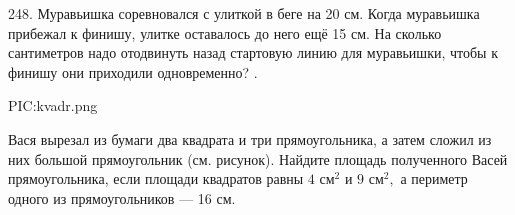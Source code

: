 248. Муравьишка соревновался с улиткой в беге на 20 см. Когда муравьишка прибежал к финишу, улитке оставалось до него ещё 15 см. На сколько сантиметров надо отодвинуть назад стартовую линию для муравьишки, чтобы к финишу они приходили одновременно?\newpage
{}. \begin{center}
{{PIC:kvadr.png}}
\end{center}
Вася вырезал из бумаги два квадрата и три прямоугольника, а затем сложил из них большой прямоугольник (см. рисунок). Найдите площадь  полученного Васей прямоугольника, если площади квадратов равны $4\text{ см}^2$ и $9\text{ см}^2,$ а периметр одного из прямоугольников --- 16 см.\\
